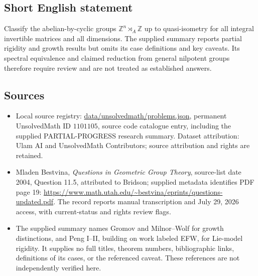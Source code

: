 \documentclass[11pt]{article}
\newcommand{\Z}{\mathbb{Z}}
\begin{document}
\subsection{Short English statement}
Classify the abelian-by-cyclic groups $\Z^n\rtimes_A\Z$ up to quasi-isometry for all integral invertible matrices and all dimensions. The supplied summary reports partial rigidity and growth results but omits its case definitions and key caveats. Its spectral equivalence and claimed reduction from general nilpotent groups therefore require review and are not treated as established answers.
\subsection{Sources}
\begin{itemize}
\item Local source registry: \url{data/unsolvedmath/problems.json}, permanent UnsolvedMath ID $1101105$, source code catalogue entry, including the supplied PARTIAL-PROGRESS research summary. Dataset attribution: Ulam AI and UnsolvedMath Contributors; source attribution and rights are retained.
\item Mladen Bestvina, \emph{Questions in Geometric Group Theory}, source-list date 2004, Question 11.5, attributed to Bridson; supplied metadata identifies PDF page 19: \url{https://www.math.utah.edu/~bestvina/eprints/questions-updated.pdf}. The record reports manual transcription and July 29, 2026 access, with current-status and rights review flags.
\item The supplied summary names Gromov and Milnor--Wolf for growth distinctions, and Peng I--II, building on work labeled EFW, for Lie-model rigidity. It supplies no full titles, theorem numbers, bibliographic links, definitions of its cases, or the referenced caveat. These references are not independently verified here.
\end{itemize}
\end{document}
